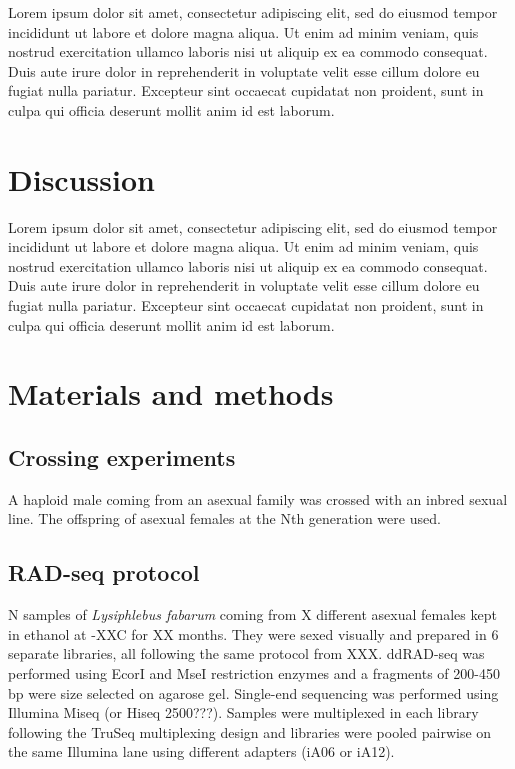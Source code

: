 \documentclass[11pt,a4paper]{report}
\begin{document}
Lorem ipsum dolor sit amet, consectetur adipiscing elit, sed do eiusmod tempor incididunt ut labore et dolore magna aliqua. Ut enim ad minim veniam, quis nostrud exercitation ullamco laboris nisi ut aliquip ex ea commodo consequat. Duis aute irure dolor in reprehenderit in voluptate velit esse cillum dolore eu fugiat nulla pariatur. Excepteur sint occaecat cupidatat non proident, sunt in culpa qui officia deserunt mollit anim id est laborum.

\FloatBarrier

\section*{Discussion}

Lorem ipsum dolor sit amet, consectetur adipiscing elit, sed do eiusmod tempor incididunt ut labore et dolore magna aliqua. Ut enim ad minim veniam, quis nostrud exercitation ullamco laboris nisi ut aliquip ex ea commodo consequat. Duis aute irure dolor in reprehenderit in voluptate velit esse cillum dolore eu fugiat nulla pariatur. Excepteur sint occaecat cupidatat non proident, sunt in culpa qui officia deserunt mollit anim id est laborum.

\section*{Materials and methods}

\subsection*{Crossing experiments}
A haploid male coming from an asexual family was crossed with an inbred sexual line. The offspring of asexual females at the Nth generation were used.

\subsection*{RAD-seq protocol}
N samples of \textit{Lysiphlebus fabarum } coming from X different asexual females kept in ethanol at -XX\degree C for XX months. They were sexed visually and prepared in 6 separate libraries, all following the same protocol from XXX. ddRAD-seq was performed using EcorI and MseI restriction enzymes and a fragments  of 200-450 bp were size selected on agarose gel. Single-end sequencing was performed using Illumina Miseq (or Hiseq 2500???). Samples were multiplexed in each library following the TruSeq multiplexing design and libraries were pooled pairwise on the same Illumina lane using different adapters (iA06 or iA12).
\end{document}
